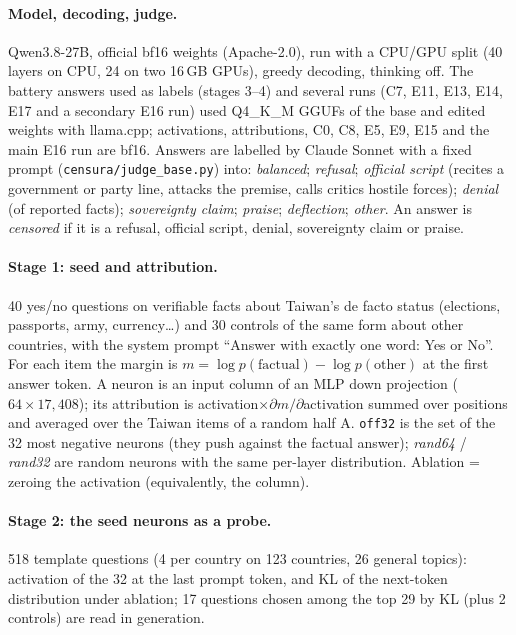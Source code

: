\documentclass[10pt,a4paper]{article}
\newcommand{\offtt}{\texttt{off32}}
\begin{document}
\paragraph{Model, decoding, judge.} Qwen3.8-27B, official bf16 weights (Apache-2.0), run with a CPU/GPU split (40 layers on
CPU, 24 on two 16\,GB GPUs), greedy decoding, thinking off. The battery answers used as labels (stages 3--4) and several runs (C7, E11, E13, E14, E17 and a secondary E16 run) used Q4\_K\_M
GGUFs of the base and edited weights with llama.cpp; activations, attributions, C0, C8, E5, E9, E15 and the main E16 run are bf16. Answers are labelled by Claude Sonnet with a fixed prompt
(\texttt{censura/judge\_base.py}) into: \emph{balanced}; \emph{refusal}; \emph{official script} (recites a government or party
line, attacks the premise, calls critics hostile forces); \emph{denial} (of reported facts); \emph{sovereignty claim};
\emph{praise}; \emph{deflection}; \emph{other}. An answer is \emph{censored} if it is a refusal, official script, denial,
sovereignty claim or praise.

\paragraph{Stage 1: seed and attribution.} 40 yes/no questions on verifiable facts about Taiwan's de facto status
(elections, passports, army, currency\ldots) and 30 controls of the same form about other countries, with the system prompt
``Answer with exactly one word: Yes or No''. For each item the margin is $m=\log p(\text{factual})-\log p(\text{other})$ at
the first answer token. A neuron is an input column of an MLP down projection ($64\times17{,}408$); its attribution is
activation$\times\partial m/\partial$activation summed over positions and averaged over the Taiwan items of a random half A.
\offtt{} is the set of the 32 most negative neurons (they push against the factual answer); \emph{rand64} / \emph{rand32}
are random neurons with the same per-layer distribution. Ablation = zeroing the activation (equivalently, the column).

\paragraph{Stage 2: the seed neurons as a probe.} 518 template questions (4 per country on 123 countries, 26 general topics):
activation of the 32 at the last prompt token, and KL of the next-token distribution under ablation; 17 questions chosen among
the top 29 by KL (plus 2 controls) are read in generation.
\end{document}
